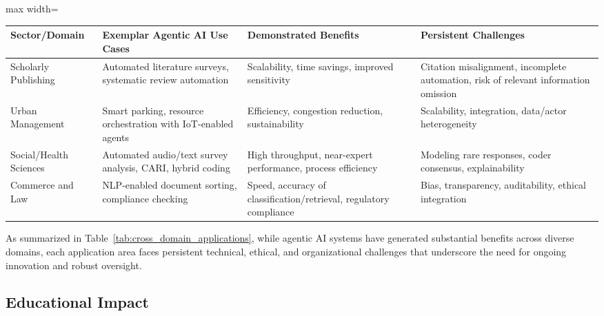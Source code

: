 \documentclass[sigconf]{acmart}
\begin{document}
\begin{table*}[htbp]
\centering
\caption{Representative Cross-Sector Agentic AI Applications and Key Challenges}
\label{tab:cross_domain_applications}
\begin{adjustbox}{max width=\textwidth}
\begin{tabular}{@{}llll@{}}
\toprule
\textbf{Sector/Domain} & \textbf{Exemplar Agentic AI Use Cases} & \textbf{Demonstrated Benefits} & \textbf{Persistent Challenges} \\
\midrule
Scholarly Publishing & Automated literature surveys, systematic review automation & Scalability, time savings, improved sensitivity & Citation misalignment, incomplete automation, risk of relevant information omission \\
Urban Management & Smart parking, resource orchestration with IoT-enabled agents & Efficiency, congestion reduction, sustainability & Scalability, integration, data/actor heterogeneity \\
Social/Health Sciences & Automated audio/text survey analysis, CARI, hybrid coding & High throughput, near-expert performance, process efficiency & Modeling rare responses, coder consensus, explainability \\
Commerce and Law & NLP-enabled document sorting, compliance checking & Speed, accuracy of classification/retrieval, regulatory compliance & Bias, transparency, auditability, ethical integration \\
\bottomrule
\end{tabular}
\end{adjustbox}
\end{table*}

As summarized in Table~\ref{tab:cross_domain_applications}, while agentic AI systems have generated substantial benefits across diverse domains, each application area faces persistent technical, ethical, and organizational challenges that underscore the need for ongoing innovation and robust oversight.

\subsection{Educational Impact}
\end{document}
